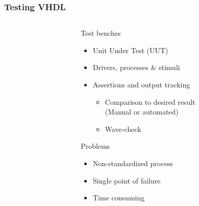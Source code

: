 \documentclass[british,10pt]{beamer}
\begin{document}
\begin{frame}\frametitle{Testing VHDL}
\begin{columns}
\begin{column}{0.05\textwidth}
\end{column}
\begin{column}{0.55\textwidth}
Test benches
\begin{itemize}
\item Unit Under Test (UUT)
\item Drivers, processes \& stimuli
\item Assertions and output tracking
\begin{itemize}
\item Comparison to desired result
\\(Manual or automated)
\item Wave-check
\end{itemize}
\end{itemize}
\vspace{0.25cm}
Problems
\begin{itemize}
\item Non-standardized process
\item Single point of failure
\item Time consuming
\end{itemize}
\end{column}
\raggedleft

\end{columns}
\end{frame}
\end{document}
